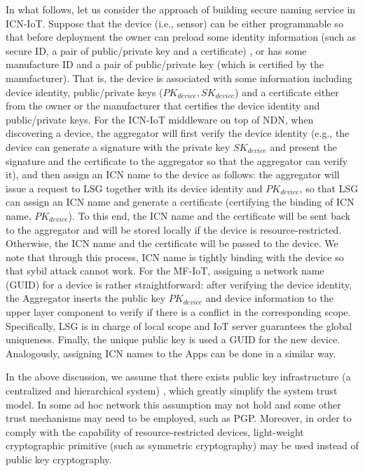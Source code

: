 In what follows, let us consider the approach of building secure naming service in ICN-IoT. Suppose that the device (i.e., sensor) can be either programmable so that before deployment the owner can preload some identity information (such as secure ID, a pair of public/private key and a certificate) , or has some manufacture ID and a pair of public/private key (which is certified by the manufacturer). That is, the device is associated with some information including device identity, public/private keys ($PK_{device}, SK_{device}$) and a certificate either from the owner or the manufacturer that certifies the device identity and public/private keys. For the ICN-IoT middleware on top of NDN, when discovering a device, the aggregator will first verify the device identity (e.g., the device can generate a signature with the private key $SK_{device}$ and present the signature and the certificate to the aggregator so that the aggregator can verify it), and then assign an ICN name to the device as follows: the aggregator will issue a request to LSG together with its device identity and $PK_{device}$, so that LSG can assign an ICN name and generate a certificate (certifying the binding of ICN name, $PK_{device}$). To this end, the ICN name and the certificate will be sent back to the aggregator and will be stored locally if the device is resource-restricted. Otherwise, the ICN name and the certificate will be passed to the device. We note that through this process, ICN name is tightly binding with the device so that sybil attack cannot work. For the MF-IoT, assigning a network name (GUID) for a device is rather straightforward: after verifying the device identity, the Aggregator
inserts the public key $PK_{device}$ and device information to the upper layer component to verify if there is a conflict in the corresponding scope. Specifically, LSG is in charge of local scope and IoT server guarantees the global uniqueness. Finally, the unique public key is used a GUID for the new device. Analogously, assigning ICN names to the Apps can be done in a similar way.
 
In the above discussion, we assume that there exists public key infrastructure (a centralized and hierarchical system) , which greatly simplify the system trust model. In some ad hoc network this assumption may not hold and some other trust mechanisms may need to be employed, such as PGP. Moreover, in order to comply with the capability of resource-restricted devices, light-weight cryptographic primitive (such as symmetric cryptography) may be used instead of public key cryptography.

